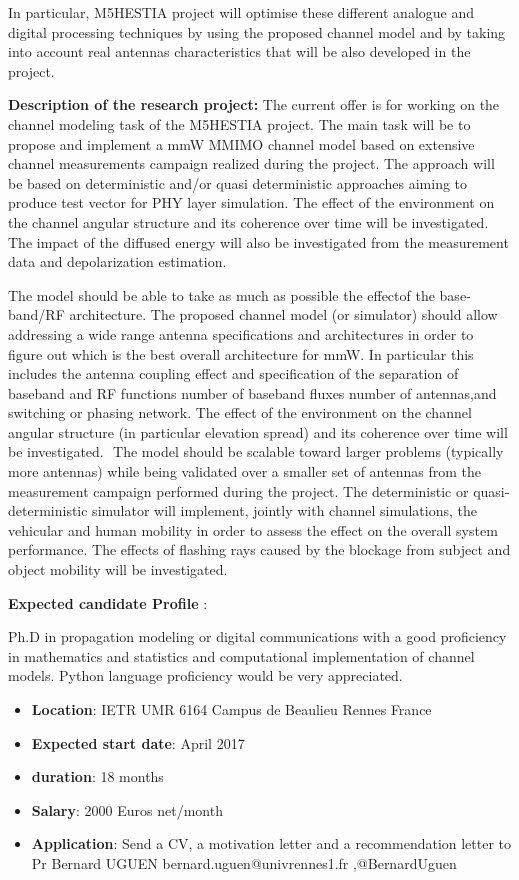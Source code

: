 \documentclass[10pt,stdletter,dateno,sigleft]{newlfm} %
\begin{document}
\begin{newlfm}
In particular, M5HESTIA project will optimise these  different
analogue and digital processing techniques by using the
proposed channel model and by taking  into account real antennas
characteristics that will be also developed in the project.


{\bf Description of the research project:} 
The current offer is for working on
the channel modeling task of the M5HESTIA project. 
The main task will be to propose and implement a mmW M­MIMO channel model based on extensive channel
measurements campaign realized during the project. The approach will be based on deterministic
and/or quasi deterministic approaches aiming to produce test vector for PHY layer simulation. The
effect of the environment on the channel angular structure and its coherence over time will be
investigated. The impact of the diffused energy will also be investigated from the measurement data
and depolarization estimation.


The model should be able  to take as much as possible the effectof the base­band/RF architecture.
The proposed channel model (or simulator) should allow addressing a wide range antenna
specifications and architectures in order to figure out which is the best overall architecture for mmW.
In particular this includes the antenna coupling effect and specification of the separation of baseband
and RF functions number of baseband fluxes number of antennas,and switching or phasing network.
The effect of the environment on the channel angular structure (in particular elevation spread) and its
coherence over time will be investigated. ​
The model should be scalable toward larger problems 
(typically more antennas) while being validated over a smaller set of antennas from the measurement
campaign performed during the project.
The deterministic or quasi­ deterministic simulator will implement, jointly with channel simulations,
the vehicular and human mobility in order to assess the effect on the overall system performance.
The effects of flashing rays caused by the  blockage from subject and object  mobility will be
investigated.

{\bf Expected candidate Profile }: 

Ph.D in propagation modeling or digital communications with a good
proficiency in mathematics and statistics and computational implementation of channel models.
Python language proficiency would be very appreciated.

\begin{itemize}
\item {\bf Location}:
IETR­ UMR 6164­ Campus de Beaulieu Rennes­ France
\item {\bf Expected start date}:
April 2017 
\item {\bf duration}: 18 months
\item {\bf Salary}:
     2000 Euros net/month
\item {\bf Application}:
Send a CV, a motivation letter and a recommendation letter
to Pr Bernard UGUEN­
bernard.uguen@univ­rennes1.fr
,@BernardUguen
\end{itemize}


\end{newlfm}
\end{document}
